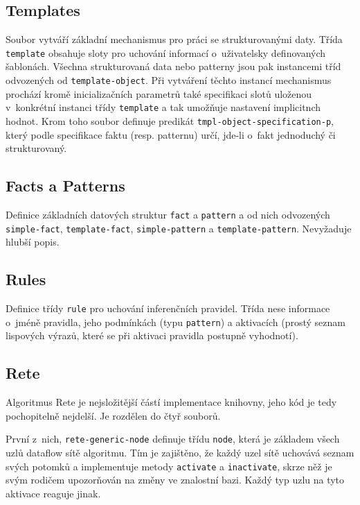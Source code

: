 \subsection{Templates}
Soubor vytváří základní mechanismus pro práci se strukturovanými daty.
Třída \verb|template| obsahuje sloty pro uchování informací o~uživatelsky
definovaných šablonách. Všechna strukturovaná data nebo patterny jsou pak
instancemi tříd odvozených od \verb|template-object|. Při vytváření těchto
instancí mechanismus prochází kromě inicializačních parametrů také specifikaci
slotů uloženou v~konkrétní instanci třídy \verb|template| a tak umožňuje
nastavení implicitnch hodnot. Krom toho soubor definuje predikát
\verb|tmpl-object-specification-p|, který podle specifikace faktu (resp.
patternu) určí, jde-li o~fakt jednoduchý či strukturovaný.
\subsection{Facts a Patterns}
Definice základních datových struktur \verb|fact| a \verb|pattern| a od nich
odvozených \verb|simple-fact|, \verb|template-fact|, \verb|simple-pattern|
a \verb|template-pattern|. Nevyžaduje hlubší popis.
\subsection{Rules}
Definice třídy \verb|rule| pro uchování inferenčních pravidel. Třída nese
informace o~jméně pravidla, jeho podmínkách (typu \verb|pattern|) a aktivacích
(prostý seznam lispových výrazů, které se při aktivaci pravidla postupně
vyhodnotí).
\subsection{Rete}
Algoritmus Rete je nejsložitější částí implementace knihovny, jeho kód je tedy
pochopitelně nejdelší. Je rozdělen do čtyř souborů.

První z~nich, \verb|rete-generic-node| definuje třídu \verb|node|, která je
základem všech uzlů dataflow sítě algoritmu. Tím je zajištěno, že každý uzel
sítě uchovává seznam svých potomků a implementuje metody \verb|activate|
a \verb|inactivate|, skrze něž je svým rodičem upozorňován na změny ve znalostní
bazi. Každý typ uzlu na tyto aktivace reaguje jinak.

